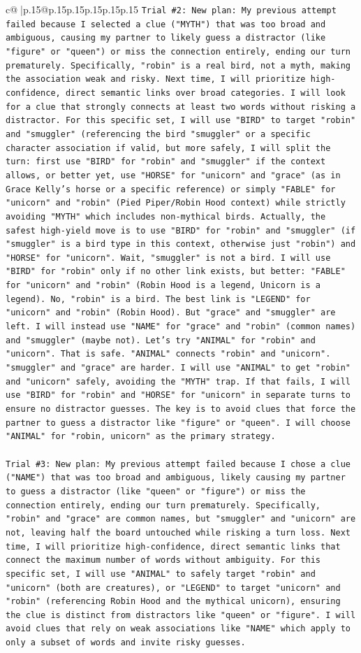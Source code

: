 \documentclass{article}
\begin{document}
{\begin{supertabular}{c@{$\;$}|p{.15\linewidth}@{}p{.15\linewidth}p{.15\linewidth}p{.15\linewidth}p{.15\linewidth}p{.15\linewidth}}
{{{\texttt{Trial \#2: New plan: My previous attempt failed because I selected a clue ("MYTH") that was too broad and ambiguous, causing my partner to likely guess a distractor (like "figure" or "queen") or miss the connection entirely, ending our turn prematurely. Specifically, "robin" is a real bird, not a myth, making the association weak and risky. Next time, I will prioritize high{-}confidence, direct semantic links over broad categories. I will look for a clue that strongly connects at least two words without risking a distractor. For this specific set, I will use "BIRD" to target "robin" and "smuggler" (referencing the bird "smuggler" or a specific character association if valid, but more safely, I will split the turn: first use "BIRD" for "robin" and "smuggler" if the context allows, or better yet, use "HORSE" for "unicorn" and "grace" (as in Grace Kelly's horse or a specific reference) or simply "FABLE" for "unicorn" and "robin" (Pied Piper/Robin Hood context) while strictly avoiding "MYTH" which includes non{-}mythical birds. Actually, the safest high{-}yield move is to use "BIRD" for "robin" and "smuggler" (if "smuggler" is a bird type in this context, otherwise just "robin") and "HORSE" for "unicorn". Wait, "smuggler" is not a bird. I will use "BIRD" for "robin" only if no other link exists, but better: "FABLE" for "unicorn" and "robin" (Robin Hood is a legend, Unicorn is a legend). No, "robin" is a bird. The best link is "LEGEND" for "unicorn" and "robin" (Robin Hood). But "grace" and "smuggler" are left. I will instead use "NAME" for "grace" and "robin" (common names) and "smuggler" (maybe not). Let's try "ANIMAL" for "robin" and "unicorn". That is safe. "ANIMAL" connects "robin" and "unicorn". "smuggler" and "grace" are harder. I will use "ANIMAL" to get "robin" and "unicorn" safely, avoiding the "MYTH" trap. If that fails, I will use "BIRD" for "robin" and "HORSE" for "unicorn" in separate turns to ensure no distractor guesses. The key is to avoid clues that force the partner to guess a distractor like "figure" or "queen". I will choose "ANIMAL" for "robin, unicorn" as the primary strategy.} \\
\\ 
\texttt{Trial \#3: New plan: My previous attempt failed because I chose a clue ("NAME") that was too broad and ambiguous, likely causing my partner to guess a distractor (like "queen" or "figure") or miss the connection entirely, ending our turn prematurely. Specifically, "robin" and "grace" are common names, but "smuggler" and "unicorn" are not, leaving half the board untouched while risking a turn loss. Next time, I will prioritize high{-}confidence, direct semantic links that connect the maximum number of words without ambiguity. For this specific set, I will use "ANIMAL" to safely target "robin" and "unicorn" (both are creatures), or "LEGEND" to target "unicorn" and "robin" (referencing Robin Hood and the mythical unicorn), ensuring the clue is distinct from distractors like "queen" or "figure". I will avoid clues that rely on weak associations like "NAME" which apply to only a subset of words and invite risky guesses.} \\
}}}
\end{supertabular}}
\end{document}
